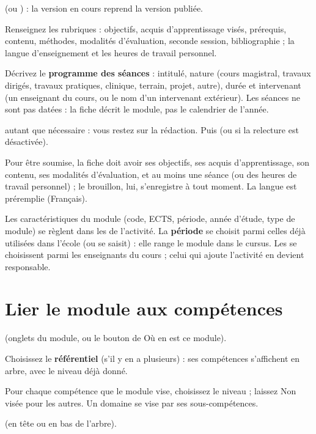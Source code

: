 \documentclass[11pt,a4paper]{article}
\begin{document}
\begin{etapes}
  \item {} (ou ) : la version en cours
    reprend la version publiée.
  \item Renseignez les rubriques : objectifs, acquis d'apprentissage visés, prérequis, contenu,
    méthodes, modalités d'évaluation, seconde session, bibliographie ; la langue
    d'enseignement et les heures de travail personnel.
  \item Décrivez le \textbf{programme des séances} : intitulé, nature (cours magistral,
    travaux dirigés, travaux pratiques, clinique, terrain, projet, autre), durée et intervenant
    (un enseignant du cours, ou le nom d'un intervenant extérieur). Les séances ne sont pas
    datées : la fiche décrit le module, pas le calendrier de l'année.
  \item {} autant que nécessaire : vous restez sur la rédaction.
    Puis  (ou  si la
    relecture est désactivée).
\end{etapes}

Pour être soumise, la fiche doit avoir ses objectifs, ses acquis d'apprentissage, son contenu,
ses modalités d'évaluation, et au moins une séance (ou des heures de travail personnel) ; le
brouillon, lui, s'enregistre à tout moment. La langue est préremplie (\og Français\fg{}).



Les caractéristiques du module (code, ECTS, période, année d'étude, type de module) se règlent
dans les  de l'activité. La \textbf{période} se choisit parmi celles déjà
utilisées dans l'école (ou se saisit) : elle range le module dans le cursus. Les  se choisissent parmi les
enseignants du cours ; celui qui ajoute l'activité en devient responsable.


\section{Lier le module aux compétences}

\begin{etapes}
  \item {} (onglets du module, ou le bouton de \og Où en est ce module\fg{}).
  \item Choisissez le \textbf{référentiel} (s'il y en a plusieurs) : ses compétences s'affichent
    en arbre, avec le niveau déjà donné.
  \item Pour chaque compétence que le module vise, choisissez le niveau ; laissez
    \og Non visée\fg{} pour les autres. Un domaine se vise par ses sous-compétences.
  \item {} (en tête ou en bas de l'arbre).
\end{etapes}
\end{document}
